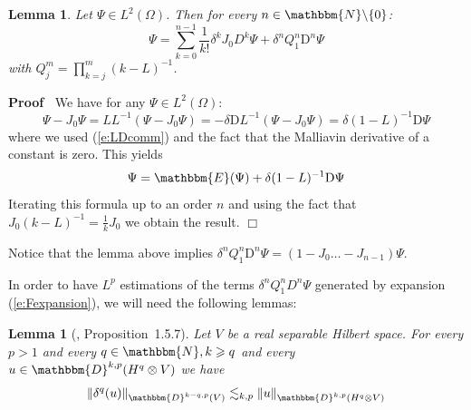 \documentclass[a4paper,11pt]{article}
\newcommand{\mathD}{\mathrm{D}}
\newenvironment{proof}{\noindent\textbf{Proof\ }}{\hspace*{\fill}$\Box$\medskip}
\newtheorem{lemma}[theorem]{Lemma}
{\theorembodyfont{\rmfamily}\newtheorem{remark}[theorem]{Remark}}
\begin{document}
\begin{lemma}
  Let $\Psi \in L^2 (\Omega)$. Then for every $n \in \mathbbm{N}\backslash \{
  0 \}$:
  \begin{equation}
    \Psi = \sum_{k = 0}^{n - 1} \frac{1}{k!} \delta^k J_0 D^k \Psi + \delta^n
    Q_1^n \mathD^n \Psi \label{e:Fexpansion}
  \end{equation}
  with $Q_j^m = \prod_{k = j}^m (k - L)^{- 1}$.
\end{lemma}

\begin{proof}
  We have for any $\Psi \in L^2 (\Omega)$:
  \[ \Psi - J_0 \Psi = L L^{- 1} (\Psi - J_0 \Psi) = - \delta \mathD L^{- 1}
     (\Psi - J_0 \Psi) = \delta (1 - L)^{- 1} \mathD \Psi \]
  where we used (\ref{e:LDcomm}) and the fact that the Malliavin derivative of
  a constant is zero. This yields
  \begin{equation}
    \Psi =\mathbbm{E} (\Psi) + \delta (1 - L)^{- 1} \mathD \Psi
  \end{equation}
  Iterating this formula up to an order $n$ and using the fact that $J_0 (k -
  L)^{- 1} = \frac{1}{k} J_0$ we obtain the result.
\end{proof}

Notice that the lemma above implies $\delta^n Q_1^n \mathD^n \Psi = (1 - J_0
\ldots - J_{n - 1}) \Psi$.

In order to have $L^p$ estimations of the terms $\delta^n Q_1^n D^n \Psi$
generated by expansion (\ref{e:Fexpansion}), we will need the following
lemmas:

\begin{lemma}[{\cite{nualart_2006}}, Proposition~1.5.7]
  \label{l:delta-norm}Let $V$ be a real separable Hilbert space. For every $p
  > 1$ and every $q \in \mathbbm{N}, k \geqslant q$ and every $u \in
  \mathbbm{D}^{k, p} (H^q \otimes V)$ we have
  \[ \| \delta^q (u) \|_{\mathbbm{D}^{k - q, p} (V)} \lesssim_{k, p} \| u
     \|_{\mathbbm{D}^{k, p} (H^q \otimes V)} \]
\end{lemma}
\end{document}
